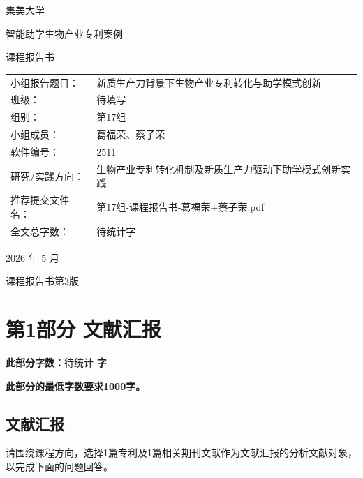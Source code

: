 \documentclass[UTF8,zihao=-4]{ctexart}
\newcommand{\wordcount}[1]{\noindent\textbf{此部分字数：}#1\textbf{ 字}\par}
\begin{document}
\begin{titlepage}
    \centering
    \vspace*{1.5cm}
    {\heiti 集美大学\par}
    \vspace{1.2cm}
    {\heiti 智能助学生物产业专利案例\par}
    \vspace{0.8cm}
    {\heiti 课程报告书\par}
    \vspace{2.0cm}

    \begin{tabular}{>{\heiti}p{4cm}p{8cm}}
        小组报告题目： & 新质生产力背景下生物产业专利转化与助学模式创新 \\
        班级： & 待填写 \\
        组别： & 第17组 \\
        小组成员： & 葛福荣、蔡子荣 \\
        软件编号： & 2511 \\
        研究/实践方向： & 生物产业专利转化机制及新质生产力驱动下助学模式创新实践 \\
        推荐提交文件名： & 第17组-课程报告书-葛福荣+蔡子荣.pdf \\
        全文总字数： & 待统计\quad 字 \\
    \end{tabular}

    \vfill
    {2026 年 5 月\par}
    \vspace{0.5cm}
    {课程报告书第3版\par}
\end{titlepage}

\tableofcontents
\newpage

\section*{第1部分 文献汇报}
\wordcount{待统计}
\noindent\textbf{此部分的最低字数要求1000字。}

\subsection*{文献汇报}

请围绕课程方向，选择1篇专利及1篇相关期刊文献作为文献汇报的分析文献对象，以完成下面的问题回答。
\end{document}
